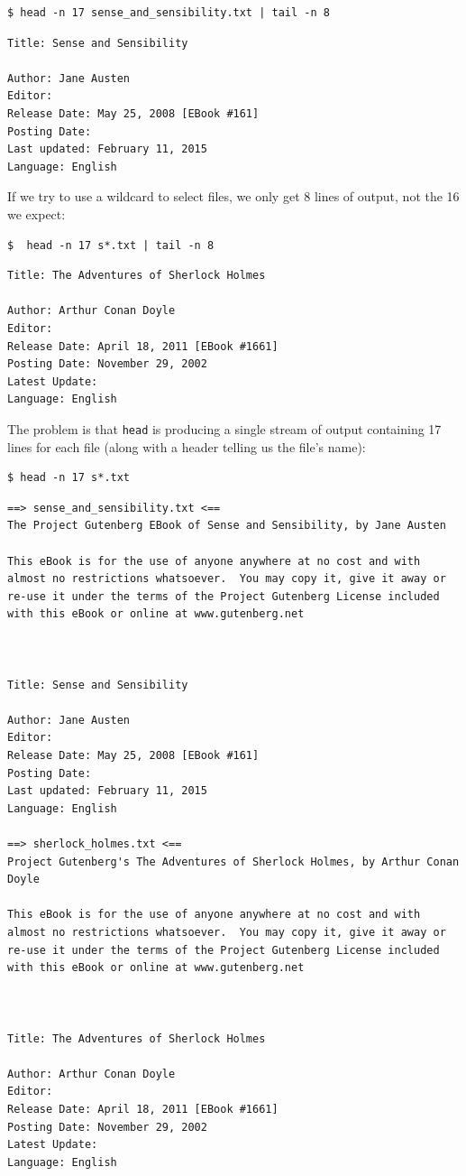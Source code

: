 \documentclass[
]{krantz}
\begin{document}
\begin{verbatim}
$ head -n 17 sense_and_sensibility.txt | tail -n 8
\end{verbatim}

\begin{verbatim}
Title: Sense and Sensibility

Author: Jane Austen
Editor:
Release Date: May 25, 2008 [EBook #161]
Posting Date:
Last updated: February 11, 2015
Language: English
\end{verbatim}

If we try to use a wildcard to select files,
we only get 8 lines of output,
not the 16 we expect:

\begin{verbatim}
$  head -n 17 s*.txt | tail -n 8
\end{verbatim}

\begin{verbatim}
Title: The Adventures of Sherlock Holmes

Author: Arthur Conan Doyle
Editor:
Release Date: April 18, 2011 [EBook #1661]
Posting Date: November 29, 2002
Latest Update:
Language: English
\end{verbatim}

The problem is that \texttt{head} is producing a single stream of output
containing 17 lines for each file
(along with a header telling us the file's name):

\begin{verbatim}
$ head -n 17 s*.txt
\end{verbatim}

\begin{verbatim}
==> sense_and_sensibility.txt <==
The Project Gutenberg EBook of Sense and Sensibility, by Jane Austen

This eBook is for the use of anyone anywhere at no cost and with
almost no restrictions whatsoever.  You may copy it, give it away or
re-use it under the terms of the Project Gutenberg License included
with this eBook or online at www.gutenberg.net



Title: Sense and Sensibility

Author: Jane Austen
Editor:
Release Date: May 25, 2008 [EBook #161]
Posting Date:
Last updated: February 11, 2015
Language: English

==> sherlock_holmes.txt <==
Project Gutenberg's The Adventures of Sherlock Holmes, by Arthur Conan Doyle

This eBook is for the use of anyone anywhere at no cost and with
almost no restrictions whatsoever.  You may copy it, give it away or
re-use it under the terms of the Project Gutenberg License included
with this eBook or online at www.gutenberg.net



Title: The Adventures of Sherlock Holmes

Author: Arthur Conan Doyle
Editor:
Release Date: April 18, 2011 [EBook #1661]
Posting Date: November 29, 2002
Latest Update:
Language: English
\end{verbatim}
\end{document}
